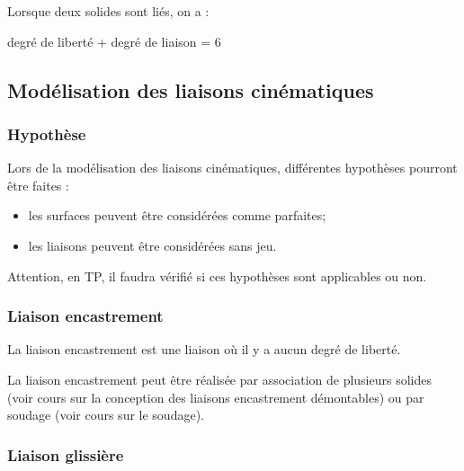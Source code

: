 \documentclass[10pt,oneside]{article}
\begin{document}
\begin{resultat}
Lorsque deux solides sont liés, on a : 
\begin{center}
degré de liberté + degré de liaison = 6
\end{center}
\end{resultat}






\newpage

\subsection{Modélisation des liaisons cinématiques}
\subsubsection{Hypothèse}
Lors de la modélisation des liaisons cinématiques, différentes hypothèses pourront être faites :
\begin{itemize}
\item les surfaces peuvent être considérées comme parfaites; 
\item les liaisons peuvent être considérées sans jeu.
\end{itemize}

Attention, en TP, il faudra vérifié si ces hypothèses sont applicables ou non.

\subsubsection{Liaison encastrement}
La liaison encastrement est une liaison où il y a aucun degré de liberté. 

La liaison encastrement peut être réalisée par association de plusieurs solides (voir cours sur la conception des liaisons encastrement démontables) ou par soudage (voir cours sur le soudage).


\subsubsection{Liaison glissière}
\end{document}
